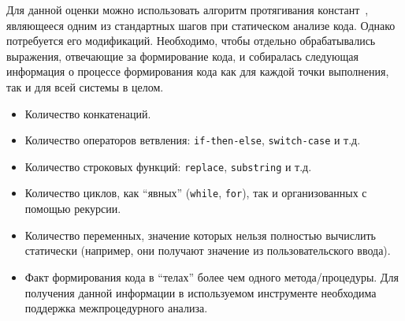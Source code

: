 \begin{enumerate}
\begin{itemize}
    Для данной оценки можно использовать алгоритм протягивания констант~\cite{Dragon}, являющееся одним из стандартных шагов при статическом анализе кода. Однако потребуется его модификаций. Необходимо, чтобы отдельно обрабатывались выражения, отвечающие за формирование кода, и собиралась следующая информация о процессе формирования кода как для каждой точки выполнения, так и для всей системы в целом.
    \begin{itemize}
      \item Количество конкатенаций.
      \item Количество операторов ветвления: \verb|if-then-else|, \verb|switсh-case| и т.д.
      \item Количество строковых функций: \verb|replace|, \verb|substring| и т.д.
      \item Количество циклов, как ``явных'' (\verb|while|, \verb|for|), так и организованных с помощью рекурсии.
      \item Количество переменных, значение которых нельзя полностью вычислить статически (например, они получают значение из пользовательского ввода).
      \item Факт формирования кода в ``телах'' более чем одного метода/процедуры. Для получения данной информации в используемом инструменте необходима поддержка межпроцедурного анализа.
    \end{itemize}
  \end{itemize}


\end{enumerate}

